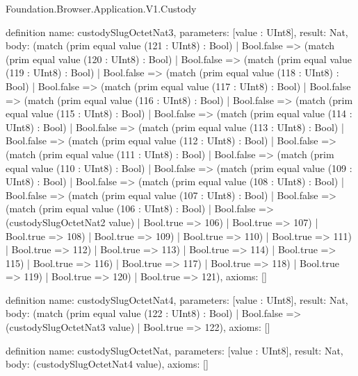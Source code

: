 \begin{lexlean}{Foundation.Browser.Application.V1.Custody}
\begin{semanticmodule}
definition{
  name: custodySlugOctetNat3,
  parameters: [value : UInt8],
  result: Nat,
  body: (match (prim equal value (121 : UInt8) : Bool)
    | Bool.false => (match (prim equal value (120 : UInt8) : Bool)
      | Bool.false => (match (prim equal value (119 : UInt8) : Bool)
        | Bool.false => (match (prim equal value (118 : UInt8) : Bool)
          | Bool.false => (match (prim equal value (117 : UInt8) : Bool)
            | Bool.false => (match (prim equal value (116 : UInt8) : Bool)
              | Bool.false => (match (prim equal value (115 : UInt8) : Bool)
                | Bool.false => (match (prim equal value (114 : UInt8) : Bool)
                  | Bool.false => (match (prim equal value (113 : UInt8) : Bool)
                    | Bool.false => (match (prim equal value (112 : UInt8) : Bool)
                      | Bool.false => (match (prim equal value (111 : UInt8) : Bool)
                        | Bool.false => (match (prim equal value (110 : UInt8) : Bool)
                          | Bool.false => (match (prim equal value (109 : UInt8) : Bool)
                            | Bool.false => (match (prim equal value (108 : UInt8) : Bool)
                              | Bool.false => (match (prim equal value (107 : UInt8) : Bool)
                                | Bool.false => (match (prim equal value (106 : UInt8) : Bool)
                                  | Bool.false => (custodySlugOctetNat2 value)
                                  | Bool.true => 106)
                                | Bool.true => 107)
                              | Bool.true => 108)
                            | Bool.true => 109)
                          | Bool.true => 110)
                        | Bool.true => 111)
                      | Bool.true => 112)
                    | Bool.true => 113)
                  | Bool.true => 114)
                | Bool.true => 115)
              | Bool.true => 116)
            | Bool.true => 117)
          | Bool.true => 118)
        | Bool.true => 119)
      | Bool.true => 120)
    | Bool.true => 121),
  axioms: []
}

definition{
  name: custodySlugOctetNat4,
  parameters: [value : UInt8],
  result: Nat,
  body: (match (prim equal value (122 : UInt8) : Bool)
    | Bool.false => (custodySlugOctetNat3 value)
    | Bool.true => 122),
  axioms: []
}

definition{
  name: custodySlugOctetNat,
  parameters: [value : UInt8],
  result: Nat,
  body: (custodySlugOctetNat4 value),
  axioms: []
}


\end{semanticmodule}
\end{lexlean}
